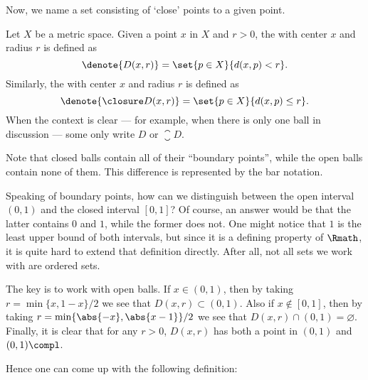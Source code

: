 Now, we name a set consisting of `close' points to a given point.

\begin{definition}[Balls]
    \label{def:ball}
    Let \(X\) be a metric space.
    Given a point \(x\) in \(X\) and \(r>0\),
    the  with center \(x\) and radius \(r\)
    is defined as
    \[
        \denote{D(x,r)}
        =\set{p\in X}{d(x,p)<r}.
    \]
    Similarly,
    the 
    with center \(x\) and radius \(r\)
    is defined as
    \[
        \denote{\closure D(x,r)}
        =\set{p\in X}{d(x,p)\le r}.
    \]
    When the context is clear
    ---
    for example, when there is only one ball in discussion
    ---
    some only write \(D\) or \(\closure D\).
\end{definition}

Note that closed balls contain all of their ``boundary points'',
while the open balls contain none of them.
This difference is represented by the bar notation.

Speaking of boundary points,
how can we distinguish between the open interval \((0,1)\)
and the closed interval \([0,1]\)?
Of course, an answer would be that
the latter contains \(0\) and \(1\),
while the former does not.
One might notice that
\(1\) is the least upper bound of both intervals,
but since it is a defining property of \(\Rmath\),
it is quite hard to extend that definition directly.
After all, not all sets we work with are ordered sets.

The key is to work with open balls.
If \(x\in(0,1)\),
then by taking \(r=\min\{x,1-x\}/2\)
we see that \(D(x,r)\subset(0,1)\).
Also if \(x\notin[0,1]\),
then by taking \(r=\min\{\abs{-x},\abs{x-1}\}/2\)
we see that \(D(x,r)\cap(0,1)=\varnothing\).
Finally, it is clear that for any \(r>0\),
\(D(x,r)\) has both a point in \((0,1)\) and \((0,1)\compl\).

Hence one can come up with the following definition:

